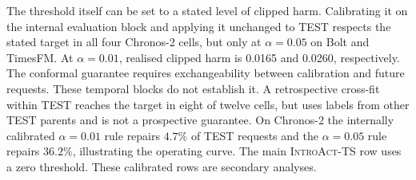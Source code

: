 \documentclass{article}
\newcommand{\introact}{\textsc{IntroAct-TS}}
\begin{document}
The threshold itself can be set to a stated level of clipped harm. Calibrating it on the
internal evaluation block and applying it unchanged to TEST respects the stated target in
all four Chronos-2 cells, but only at $\alpha=0.05$ on Bolt and TimesFM. At $\alpha=0.01$,
realised clipped harm is 0.0165 and 0.0260, respectively. The conformal guarantee requires
exchangeability between calibration and future requests. These temporal blocks do not
establish it. A retrospective cross-fit within TEST reaches the target in eight of twelve
cells, but uses labels from other TEST parents and is not a prospective guarantee. On
Chronos-2 the internally calibrated $\alpha=0.01$ rule repairs $4.7\%$ of TEST requests and
the $\alpha=0.05$ rule repairs $36.2\%$, illustrating the operating curve. The main
\introact{} row uses a zero threshold. These calibrated rows are secondary analyses.

\begin{table}[!t]
  \caption{Retrospective TEST cross-fit of the execution threshold: each half of the parents
  supplies completed-request labels to calibrate the other half. These rows are not an
  independent prospective test. Target is clipped harmful loss, realised is the empirical
  clipped value, and repair rate is the executed share.}
  \label{tab:conformal}
  \centering
  \small
  \setlength{\tabcolsep}{5pt}
\end{table}
\end{document}
